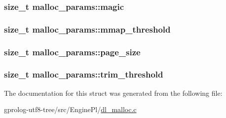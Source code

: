 \subsubsection[{\texorpdfstring{magic}{magic}}]{\setlength{\rightskip}{0pt plus 5cm}size\+\_\+t malloc\+\_\+params\+::magic}\hypertarget{structmalloc__params_a7034fc9c71af2cc5ba9cd079effdf5a8}{}\label{structmalloc__params_a7034fc9c71af2cc5ba9cd079effdf5a8}
\subsubsection[{\texorpdfstring{mmap\+\_\+threshold}{mmap_threshold}}]{\setlength{\rightskip}{0pt plus 5cm}size\+\_\+t malloc\+\_\+params\+::mmap\+\_\+threshold}\hypertarget{structmalloc__params_a5b2af958efc37d52cfa905bc98b41e1b}{}\label{structmalloc__params_a5b2af958efc37d52cfa905bc98b41e1b}
\subsubsection[{\texorpdfstring{page\+\_\+size}{page_size}}]{\setlength{\rightskip}{0pt plus 5cm}size\+\_\+t malloc\+\_\+params\+::page\+\_\+size}\hypertarget{structmalloc__params_a3b7a605d7ebe148a8fb3051465dc3979}{}\label{structmalloc__params_a3b7a605d7ebe148a8fb3051465dc3979}
\subsubsection[{\texorpdfstring{trim\+\_\+threshold}{trim_threshold}}]{\setlength{\rightskip}{0pt plus 5cm}size\+\_\+t malloc\+\_\+params\+::trim\+\_\+threshold}\hypertarget{structmalloc__params_accae9b2bcb4df63efcdc0b18826cc578}{}\label{structmalloc__params_accae9b2bcb4df63efcdc0b18826cc578}


The documentation for this struct was generated from the following file\+:\begin{DoxyCompactItemize}
\item 
gprolog-\/utf8-\/tree/src/\+Engine\+Pl/\hyperlink{dl__malloc_8c}{dl\+\_\+malloc.\+c}\end{DoxyCompactItemize}

